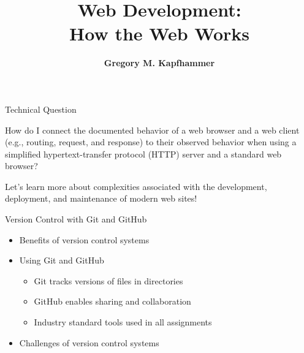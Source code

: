 \documentclass[14pt,aspectratio=169]{beamer}
\title{Web Development: \\ How the Web Works}
\author{{\bf Gregory M. Kapfhammer}}
\institute[shortinst]{{\bf Department of Computer Science, Allegheny College}}
\begin{document}
{
  \begin{frame}
    \titlepage
  \end{frame}
}

%
\begin{frame}{Technical Question}
  \hspace*{.25in}
  \begin{minipage}{5in}
    \vspace*{.2in}
    \begin{center}
      {\large How do I connect the documented behavior of a web browser and a
      web client (e.g., routing, request, and response) to their observed
    behavior when using a simplified hypertext-transfer protocol (HTTP) server
  and a standard web browser?}
    \end{center}
  \end{minipage}
  \vspace{3ex}
  \begin{center}
    \small Let's learn more about complexities associated with the development,
    deployment, and maintenance of modern web sites!
  \end{center}
\end{frame}

%
\begin{frame}{Version Control with Git and GitHub}
%
  \begin{itemize}
    \item Benefits of version control systems
    \item Using Git and GitHub
      \begin{itemize}
        \item Git tracks versions of files in directories
        \item GitHub enables sharing and collaboration
        \item Industry standard tools used in all assignments
      \end{itemize}
    \item Challenges of version control systems
  \end{itemize}
%
\end{frame}
\end{document}
